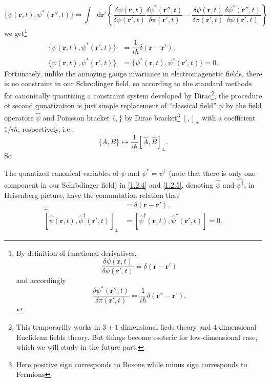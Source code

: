 \documentclass[b5paper,10pt,UTF8]{book}
\newcommand*\dd{\mathop{}\!\mathrm{d}}
\numberwithin{equation}{section}
\begin{document}
		$$\{\psi(\bm{r},t),\psi^*(\bm{r''},t)\}=\int\dd\bm{r'}\left\{\dfrac{\delta\psi(\bm{r},t)}{\delta\psi(\bm{r'},t)}\dfrac{\delta\psi^*(\bm{r''},t)}{\delta\pi(\bm{r'},t)}-\dfrac{\delta\psi(\bm{r},t)}{\delta\pi(\bm{r'},t)}\dfrac{\delta\psi^*(\bm{r''},t)}{\delta\psi(\bm{r'},t)}\right\}$$
		we get\footnote{By definition of functional derivatives, $$\dfrac{\delta\psi(\bm{r},t)}{\delta\psi(\bm{r'},t)}=\delta(\bm{r}-\bm{r'})$$ and accordingly $$\dfrac{\delta\psi^*(\bm{r''},t)}{\delta\pi(\bm{r'},t)}=\dfrac{1}{i\hbar}\delta(\bm{r''}-\bm{r'}).$$}
		\begin{align}
			\{\psi(\bm{r},t),\psi^*(\bm{r'},t)\}&=\dfrac{1}{i\hbar}\delta(\bm{r}-\bm{r'}),\label{1.2.4}\\
			\{\psi(\bm{r},t),\psi^*(\bm{r'},t)\}&=\{\psi^*(\bm{r},t),\psi^*(\bm{r'},t)\}=0.\label{1.2.5}
		\end{align}
		\indent Fortunately, unlike the annoying gauge invariance in electromagenetic fields, there is no constraint in our Schr$\ddot{\text{o}}$dinger field, so according to the standard methods for canonically quantizing a constraint system developed by Dirac\footnote{This temporarilly works in $3+1$ dimensional fieds theory and 4-dimensional Euclidean fields theory. But things become esoteric for low-dimensional case, which we will study in the future part.}, the procedure of second qunatization is just simple replacement of ``classical field'' $\psi$ by the field operators $\hat{\psi}$ and Poinsson bracket $\{,\}$ by Dirac bracket\footnote{Here positive sign corresponds to Bosons while minus sign corresponds to Fermions} $[,]_{\pm}$ with a coefficient $1/i\hbar$, respectively, i.e.,
		$$\{A,B\}\mapsto\dfrac{1}{i\hbar}[\hat{A},\hat{B}]_{\pm}.$$
		So
		\begin{Axiom}
			The quantized canonical variables of $\psi$ and $\psi^*=\psi^\dagger$ (note that there is only one component in our Schr$\ddot{\text{o}}$dinger field) in \eqref{1.2.4} and \eqref{1.2.5}, denoting $\hat{\psi}$ and $\hat{\psi^\dagger}$, in Heisenberg picture, have the commutation relation that
			\begin{align}
				[\hat{\psi}(\bm{r},t),\hat{\psi}^\dagger(\bm{r'},t)]_{\pm}&=\delta(\bm{r}-\bm{r'}),\label{1.2.6}\\
				[\hat{\psi}(\bm{r},t),\hat{\psi}^\dagger(\bm{r'},t)]_{\pm}&=[\hat{\psi}^\dagger(\bm{r},t),\hat{\psi}^\dagger(\bm{r'},t)]=0.\label{1.2.7}
			\end{align}
		\end{Axiom}
\end{document}
